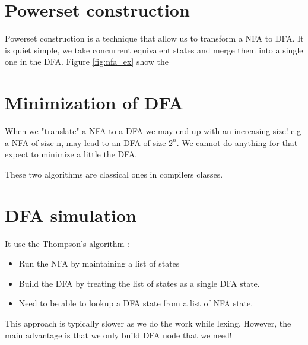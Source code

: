\section{Powerset construction}
    Powerset construction is a technique that allow us to transform a NFA to
    DFA. It is quiet simple, we take concurrent equivalent states and merge them
    into a single one in the DFA. Figure \ref{fig:nfa_ex} show the 
\section{Minimization of DFA}
    When we "translate" a NFA to a DFA we may end up with an increasing size!
    e.g a NFA of size n, may lead to an DFA of size $2^n$. We cannot do anything
    for that expect to minimize a little the DFA.

    These two algorithms are classical ones in compilers classes.

\section{DFA simulation}
    It use the Thompson's algorithm : 
    \begin{itemize}
        \item Run the NFA by maintaining a list of states
        \item Build the DFA by treating the list of states as a single DFA
        state.
        \item Need to be able to lookup a DFA state from a list of NFA state.
    \end{itemize}

    This approach is typically slower as we do the work while lexing. However,
    the main advantage is that we only build DFA node that we need!